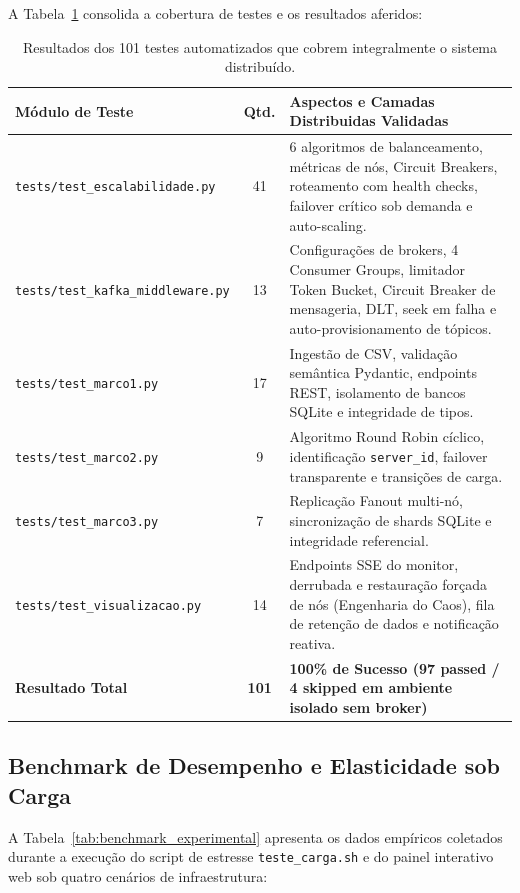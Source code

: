 \documentclass[12pt,a4paper]{article}
\begin{document}
A Tabela~\ref{tab:testes_pytest} consolida a cobertura de testes e os resultados aferidos:

\begin{table}[H]
	\centering
	\small
	\begin{tabularx}{\textwidth}{l c X}
		\toprule
		\textbf{Módulo de Teste} & \textbf{Qtd.} & \textbf{Aspectos e Camadas Distribuidas Validadas} \\
		\midrule
		\texttt{tests/test\_escalabilidade.py} & 41 & 6 algoritmos de balanceamento, métricas de nós, Circuit Breakers, roteamento com health checks, failover crítico sob demanda e auto-scaling. \\
		\texttt{tests/test\_kafka\_middleware.py} & 13 & Configurações de brokers, 4 Consumer Groups, limitador Token Bucket, Circuit Breaker de mensageria, DLT, seek em falha e auto-provisionamento de tópicos. \\
		\texttt{tests/test\_marco1.py} & 17 & Ingestão de CSV, validação semântica Pydantic, endpoints REST, isolamento de bancos SQLite e integridade de tipos. \\
		\texttt{tests/test\_marco2.py} & 9 & Algoritmo Round Robin cíclico, identificação \texttt{server\_id}, failover transparente e transições de carga. \\
		\texttt{tests/test\_marco3.py} & 7 & Replicação Fanout multi-nó, sincronização de shards SQLite e integridade referencial. \\
		\texttt{tests/test\_visualizacao.py} & 14 & Endpoints SSE do monitor, derrubada e restauração forçada de nós (Engenharia do Caos), fila de retenção de dados e notificação reativa. \\
		\midrule
		\textbf{Resultado Total} & \textbf{101} & \textbf{100\% de Sucesso (97 passed / 4 skipped em ambiente isolado sem broker)} \\
		\bottomrule
	\end{tabularx}
	\caption{Resultados dos 101 testes automatizados que cobrem integralmente o sistema distribuído.}
	\label{tab:testes_pytest}
\end{table}

\subsection{Benchmark de Desempenho e Elasticidade sob Carga}
A Tabela~\ref{tab:benchmark_experimental} apresenta os dados empíricos coletados durante a execução do script de estresse \texttt{teste\_carga.sh} e do painel interativo web sob quatro cenários de infraestrutura:
\end{document}
